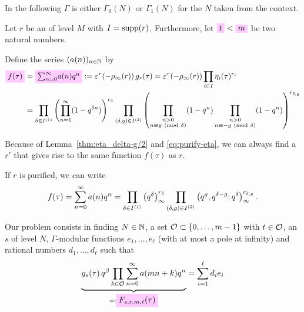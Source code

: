\documentclass{article}
\begin{document}
In the following $\Gamma$ is either $\Gamma_0(N)$ or $\Gamma_1(N)$ for
the $N$ taken from the context.

Let $r$ be an  of level $M$ with
$I=\operatorname{supp}(r)$.
%
Furthermore, let $\defineNotation{t} < \defineNotation{m}$ be two
natural numbers.

Define the series $(a(n))_{n\in\mathbb{N}}$ by
\begin{align}
  \defineNotation[f-tau]{f(\tau)}
  &=
    \defineNotation[sum-a-n-q-n]{{\protect\sum}_{n=0}^\infty a(n)q^n}
    :=
    \unityPowerTau{-\rho_\infty(r)} g_r(\tau)
    =
    \unityPowerTau{-\rho_\infty(r)} \prod_{i\in I} \eta_i(\tau)^{r_i}
  \notag
  \\
  &= \prod_{\delta\in I^{(1)}}
    \left(\prod_{n=1}^{\infty}(1-q^{\delta n})\right)^{r_\delta}
    \prod_{(\delta,g)\in I^{(2)}}
    \left(
    \prod_{\substack{n>0\\n\equiv g\ (\mathrm{mod}\ \delta)}} (1-q^n)
    \prod_{\substack{n>0\\n\equiv -g\ (\mathrm{mod}\ \delta)}} (1-q^n)
    \right)^{r_{\delta,g}}
  \label{eq:f(tau)}
\end{align}

Because of Lemma~\ref{thm:eta_delta-g/2} and \eqref{eq:purify-eta}, we
can always find a  $r'$ that gives
rise to the same function $f(\tau)$ as $r$.

If $r$ is purified, we can write
\begin{gather}
  f(\tau)
  =
    \sum_{n=0}^\infty a(n)q^n
  =
  \prod_{\delta\in I^{(1)}} \left({q}^{\delta}\right)_{\infty}^{r_\delta}
  \prod_{(\delta,g)\in I^{(2)}}
    \left( q^g, q^{\delta-g};q^\delta \right)_{\infty}^{r_{\delta,g}}.
\end{gather}


Our problem consists in finding $N\in\mathbb{N}$, a set
$\mathcal{O}_{} \subset \left\{0,\ldots,m-1\right\}$ with
$t\in\mathcal{O}_{}$, an  $s$ of level
$N$, $\Gamma$-modular functions $e_1,\ldots,e_\ell$ (with at most a
pole at infinity) and rational numbers $d_1,\ldots,d_\ell$ such that
\begin{gather}
  \underbrace{
    g_s(\tau)\,
    q^\beta
    \prod_{k\in\modularOrbit{}} \sum_{n=0}^\infty a(mn+k) q^n
    }_{=:\defineNotation[F-s,r,m,t-tau]{F_{s,r,m,t}(\tau)}}
  =
  \sum_{i=1}^\ell d_i e_i
  \label{eq:Ramanujan-Kolberg-Identity}
\end{gather}
\end{document}
